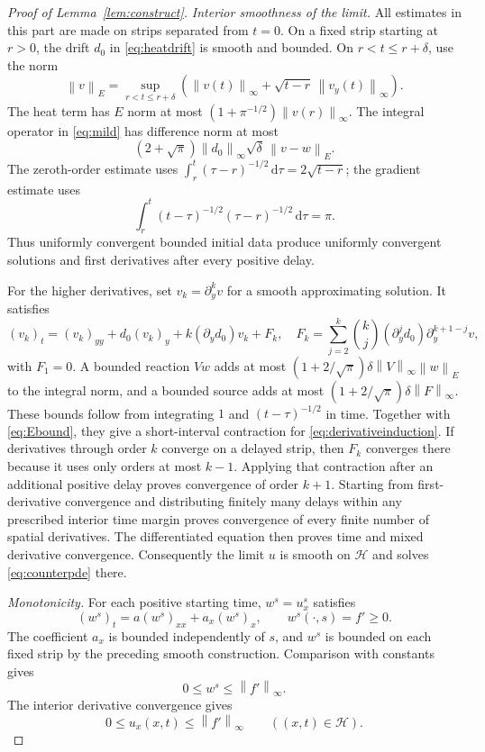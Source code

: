 \documentclass[11pt,reqno]{amsart}
\numberwithin{equation}{section}
\theoremstyle{definition}
\theoremstyle{remark}
\newcommand{\HH}{\mathcal H}
\newcommand{\dd}{\,\mathrm d}
\newcommand{\norm}[1]{\left\lVert#1\right\rVert}
\begin{document}
\begin{proof}[Proof of Lemma~\ref{lem:construct}]
\emph{Interior smoothness of the limit.}
All estimates in this part are made on strips separated from $t=0$. On a fixed strip starting at $r>0$, the drift $d_0$ in \eqref{eq:heatdrift} is smooth and bounded. On $r<t\leq r+\delta$, use the norm
\[
 \norm{v}_E=\sup_{r<t\leq r+\delta}
 \left(\norm{v(t)}_\infty+\sqrt{t-r}\,\norm{v_y(t)}_\infty\right).
\]
The heat term has $E$ norm at most $(1+\pi^{-1/2})\norm{v(r)}_\infty$. The integral operator in \eqref{eq:mild} has difference norm at most
\begin{equation}\label{eq:Ebound}
 (2+\sqrt\pi)\norm{d_0}_\infty\sqrt\delta\,\norm{v-w}_E.
\end{equation}
The zeroth-order estimate uses $\int_r^t(\tau-r)^{-1/2}\dd\tau=2\sqrt{t-r}$; the gradient estimate uses
\[
 \int_r^t(t-\tau)^{-1/2}(\tau-r)^{-1/2}\dd\tau=\pi.
\]
Thus uniformly convergent bounded initial data produce uniformly convergent solutions and first derivatives after every positive delay.

For the higher derivatives, set $v_k=\partial_y^kv$ for a smooth approximating solution. It satisfies
\begin{equation}\label{eq:derivativeinduction}
 (v_k)_t=(v_k)_{yy}+d_0(v_k)_y
 +k(\partial_yd_0)v_k+F_k,
 \quad
 F_k=\sum_{j=2}^{k}\binom{k}{j}(\partial_y^jd_0)
                  \partial_y^{k+1-j}v,
\end{equation}
with $F_1=0$. A bounded reaction $Vw$ adds at most
$(1+2/\sqrt\pi)\delta\norm V_\infty\norm w_E$ to the integral norm, and a bounded source adds at most $(1+2/\sqrt\pi)\delta\norm{F}_\infty$. These bounds follow from integrating $1$ and $(t-\tau)^{-1/2}$ in time. Together with \eqref{eq:Ebound}, they give a short-interval contraction for \eqref{eq:derivativeinduction}. If derivatives through order $k$ converge on a delayed strip, then $F_k$ converges there because it uses only orders at most $k-1$. Applying that contraction after an additional positive delay proves convergence of order $k+1$. Starting from first-derivative convergence and distributing finitely many delays within any prescribed interior time margin proves convergence of every finite number of spatial derivatives. The differentiated equation then proves time and mixed derivative convergence. Consequently the limit $u$ is smooth on $\HH$ and solves \eqref{eq:counterpde} there.

\emph{Monotonicity.}
For each positive starting time, $w^s=u_x^s$ satisfies
\begin{equation}\label{eq:derivativew}
 (w^s)_t=a(w^s)_{xx}+a_x(w^s)_x,
 \qquad w^s(\cdot,s)=f'\geq0.
\end{equation}
The coefficient $a_x$ is bounded independently of $s$, and $w^s$ is bounded on each fixed strip by the preceding smooth construction. Comparison with constants gives
\[
 0\leq w^s\leq\norm{f'}_\infty.
\]
The interior derivative convergence gives
\begin{equation}\label{eq:globalux}
 0\leq u_x(x,t)\leq\norm{f'}_\infty\qquad((x,t)\in\HH).
\end{equation}


\end{proof}
\end{document}
